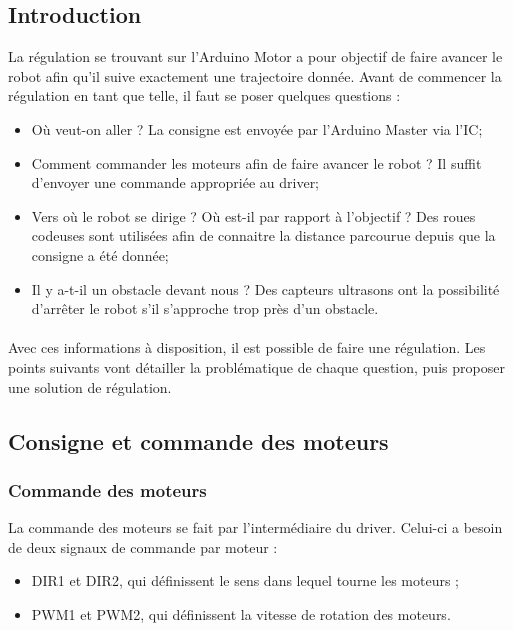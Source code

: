 \subsection{Introduction}
La régulation se trouvant sur l'Arduino Motor a pour objectif de faire avancer le robot afin qu'il suive exactement une trajectoire donnée. Avant de commencer la régulation en tant que telle, il faut se poser quelques questions :

\begin{itemize}
	\item Où veut-on aller ? La consigne est envoyée par l'Arduino Master via l'IC;
	\item Comment commander les moteurs afin de faire avancer le robot ? Il suffit d'envoyer une commande appropriée au driver;
	\item Vers où le robot se dirige ? Où est-il par rapport à l'objectif ? Des roues codeuses sont utilisées afin de connaitre la distance parcourue depuis que la consigne a été donnée;
	\item Il y a-t-il un obstacle devant nous ? Des capteurs ultrasons ont la possibilité d'arrêter le robot s'il s'approche trop près d'un obstacle.
\end{itemize}

\paragraph{}
Avec ces informations à disposition, il est possible de faire une régulation. Les points suivants vont détailler la problématique de chaque question, puis proposer une solution de régulation.

\subsection{Consigne et commande des moteurs}
\subsubsection{Commande des moteurs}
La commande des moteurs se fait par l'intermédiaire du driver. Celui-ci a besoin de deux signaux de commande par moteur :

\begin{itemize}
	\item DIR1 et DIR2, qui définissent le sens dans lequel tourne les moteurs ;
	\item PWM1 et PWM2, qui définissent la vitesse de rotation des moteurs.
\end{itemize}

